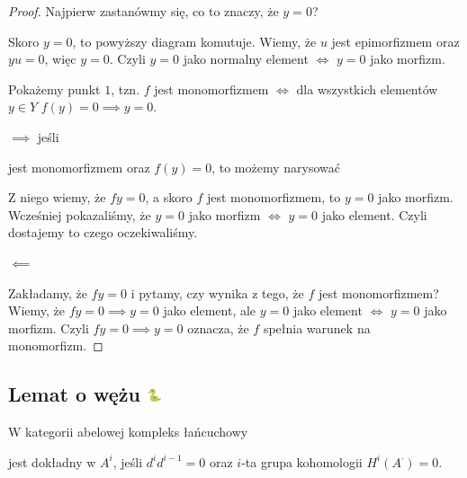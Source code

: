\begin{proof}
  Najpierw zastanówmy się, co to znaczy, że $y=0$?
  \begin{center}\end{center}
  Skoro $y=0$, to powyższy diagram komutuje. Wiemy, że $u$ jest epimorfizmem oraz $yu=0$, więc $y=0$. Czyli $y=0$ jako normalny element $\iff$ $y=0$ jako morfizm.

  Pokażemy punkt $1$, tzn. $f$ jest monomorfizmem $\iff$ dla wszystkich elementów $y\in Y$ $f(y)=0\implies y=0$.

  $\implies$ jeśli  jest monomorfizmem oraz $f(y)=0$, to możemy narysować
  \begin{center}\end{center}
  Z niego wiemy, że $fy=0$, a skoro $f$ jest monomorfizmem, to $y=0$ jako morfizm. Wcześniej pokazaliśmy, że $y=0$ jako morfizm $\iff$ $y=0$ jako element. Czyli dostajemy to czego oczekiwaliśmy.

  $\impliedby$

  Zakładamy, że $fy=0$ i pytamy, czy wynika z tego, że $f$ jest monomorfizmem? Wiemy, że $fy=0\implies y=0$ jako element, ale $y=0$ jako element $\iff$ $y=0$ jako morfizm. Czyli $fy=0\implies y=0$ oznacza, że $f$ spełnia warunek na monomorfizm. 
\end{proof}

\subsection{Lemat o wężu \includegraphics[width=4mm]{wunsz.png}}

\begin{definition}
  W kategorii abelowej kompleks łańcuchowy
  \begin{center}\end{center}
  jest dokładny w $A^i$, jeśli $d^id^{i-1}=0$ oraz $i$-ta grupa kohomologii $H^i(A^\cdot)=0$.

\end{definition}

